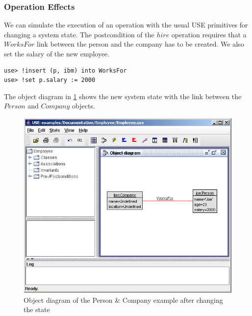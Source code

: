 \documentclass[a4paper,titlepage,oneside,final]{scrreprt} %
\begin{document}
\subsubsection{Operation Effects}
We can simulate the execution of an operation with
the usual USE primitives for changing a system state.
The postcondition of the $\mathit{hire}$ operation requires that
a $\mathit{WorksFor}$ link between the person and the company has to
be created. We also set the salary of the new employee.
\begin{verbatim}
use> !insert (p, ibm) into WorksFor
use> !set p.salary := 2000
\end{verbatim}
The object diagram in \ref{fig:EmployeeObjectsLinks}
shows the new system state with the
link between the $\mathit{Person}$ and $\mathit{Company}$ objects.
\begin{figure}[ht]
\centering
\includegraphics[scale=0.7]{Screenshots/GUI/EmployeeObjectsLinks.png}
\caption{Object diagram of the Person \& Company example after changing the state}
\label{fig:EmployeeObjectsLinks}
\end{figure}
\end{document}
